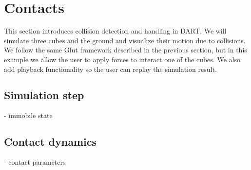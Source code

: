 \section{Contacts}
This section introduces collision detection and handling in DART. We
will simulate three cubes and the ground and visualize their motion
due to collisions. We follow the same Glut framework described in the
previous section, but in this example we allow the user to apply
forces to interact one of the cubes. We also add playback
functionality so the user can replay the simulation result.

\subsection{Simulation step}

- immobile state

\subsection{Contact dynamics}

- contact parameters
